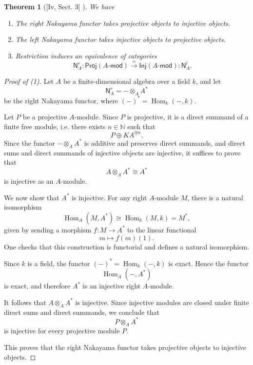 \documentclass[11pt]{article}
\newtheorem{theorem}{Theorem}[section]
\theoremstyle{definition}
\begin{document}
\begin{theorem}[{[Iv, Sect. 3]} ] 
We have
\begin{enumerate}


\item The right Nakayama functor takes projective objects to injective objects.
\item The left Nakayama functor takes injective objects to projective objects.
\item Restriction  induces an equivalence of categories $$ \mathsf{N}^r_A : \mathsf{Proj}(A\text{-}\mathsf{mod}) \overset{\simeq}{\longrightarrow}   \mathsf{Inj}(A\text{-}\mathsf{mod}) : \mathsf{N}^l_A .$$
\end{enumerate}
\end{theorem}
\begin{proof}[Proof of (1)]
Let $A$ be a finite-dimensional algebra over a field $k$, and let 
\[
\mathsf{N}^r_A = - \otimes_A A^*
\]
be the right Nakayama functor, where $(-)^* = \operatorname{Hom}_k(-,k)$.

Let $P$ be a projective $A$-module. Since $P$ is projective, it is a direct summand of a finite free module, i.e. there exists $n \in \mathbb{N}$ such that
\[
P \oplus K A^{\oplus n}.
\]
Since the functor $- \otimes_A A^*$ is additive and preserves direct summands, and direct sums and direct summands of injective objects are injective,  it suffices to prove that
\[
A \otimes_A A^* \cong A^*
\]
is injective as an $A$-module.

We now show that $A^*$ is injective. For any right $A$-module $M$, there is a natural isomorphism
\[
\operatorname{Hom}_A(M, A^*) \cong \operatorname{Hom}_k(M,k) = M^*,
\]
given by sending a morphism $f: M \to A^*$ to the linear functional
\[
m \mapsto f(m)(1).
\]
One checks that this construction is functorial and defines a natural isomorphism.

Since $k$ is a field, the functor $(-)^* = \operatorname{Hom}_k(-,k)$ is exact. Hence the functor
\[
\operatorname{Hom}_A(-, A^*)
\]
is exact, and therefore $A^*$ is an injective right $A$-module.

It follows that $A \otimes_A A^*$ is injective. Since injective modules are closed under finite direct sums and direct summands, we conclude that
\[
P \otimes_A A^*
\]
is injective for every projective module $P$.

This proves that the right Nakayama functor takes projective objects to injective objects.
\end{proof}
\end{document}

